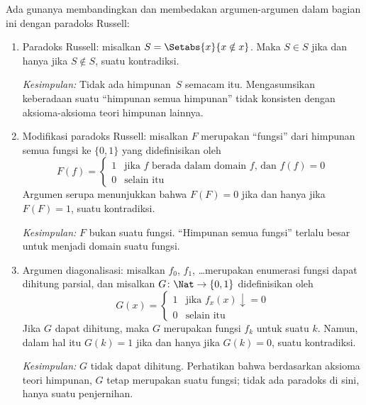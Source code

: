 \documentclass[../../../include/open-logic-section]{subfiles}
\begin{document}

Ada gunanya membandingkan dan membedakan argumen-argumen dalam bagian ini
dengan paradoks Russell:
\begin{enumerate}
\item Paradoks Russell: misalkan $S = \Setabs{x}{x \notin x}$. Maka $S \in S$
  jika dan hanya jika $S \notin S$, suatu kontradiksi.

  \emph{Kesimpulan:} Tidak ada himpunan~$S$ semacam itu. Mengasumsikan
  keberadaan suatu ``himpunan semua himpunan'' tidak konsisten dengan
  aksioma-aksioma teori himpunan lainnya.

\item Modifikasi paradoks Russell: misalkan $F$ merupakan ``fungsi'' dari
  himpunan semua fungsi ke $\{ 0, 1 \}$ yang didefinisikan oleh
  \[
  F(f) =
  \begin{cases}
    1 & \text{jika $f$ berada dalam domain $f$, dan $f(f) = 0$} \\
    0 & \text{selain itu}
  \end{cases}
  \]
  Argumen serupa menunjukkan bahwa $F(F) = 0$ jika dan hanya jika $F(F) = 1$,
  suatu kontradiksi.

  \emph{Kesimpulan:} $F$ bukan suatu fungsi. ``Himpunan semua fungsi'' terlalu
  besar untuk menjadi domain suatu fungsi.

\item Argumen diagonalisasi: misalkan $f_0$, $f_1$, \dots merupakan enumerasi
  fungsi dapat dihitung parsial, dan misalkan $G \colon \Nat \to \{ 0, 1 \}$
  didefinisikan oleh
  \[
  G(x) =
  \begin{cases}
    1 & \text{jika $f_x(x)\downarrow = 0$} \\
    0 & \text{selain itu}
  \end{cases}
  \]
  Jika $G$ dapat dihitung, maka $G$ merupakan fungsi $f_k$ untuk suatu $k$.
  Namun, dalam hal itu $G(k) = 1$ jika dan hanya jika $G(k) = 0$, suatu
  kontradiksi.

  \emph{Kesimpulan:} $G$ tidak dapat dihitung. Perhatikan bahwa berdasarkan
  aksioma teori himpunan, $G$ tetap merupakan suatu fungsi; tidak ada paradoks
  di sini, hanya suatu penjernihan.
\end{enumerate}
\end{document}
